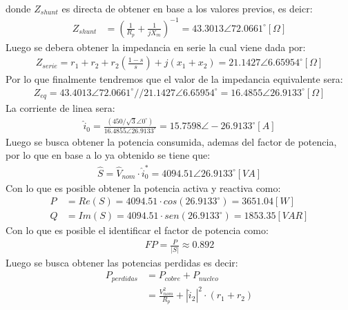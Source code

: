 \documentclass[
  11pt,
  letterpaper,
   addpoints,
   answers
  ]{exam}
\begin{document}
\begin{questions}
\begin{solution}
\begin{align}
        \end{align}
        donde $Z_{shunt}$ es directa de obtener en base a los valores previos, es deicr:
        \begin{align}
            Z_{shunt} &= \left( \frac{1}{R_{p}} + \frac{1}{jX_{m}}\right)^{-1} = 43.3013 \angle 72.0661^{\circ}[\Omega]
        \end{align}
        Luego se debera obtener la impedancia en serie la cual viene dada por:
        \begin{align}
            Z_{serie} = r_{1} + r_{2} + r_{2}\left(\frac{1-s}{s}\right) + j(x_{1} + x_{2}) = 21.1427 \angle 6.65954^{\circ}[\Omega]
        \end{align}
        Por lo que finalmente tendremos que el valor de la impedancia equivalente sera:
        \begin{align}
            Z_{eq} = 43.4013 \angle 72.0661^{\circ} // 21.1427 \angle 6.65954^{\circ} = 16.4855\angle 26.9133^{\circ}[\Omega]
        \end{align}
       La corriente de linea sera:
        \begin{align}
            \hat{i}_{0} = \frac{(450/\sqrt{3} \angle 0^{\circ})}{16.4855 \angle 26.9133^{\circ}} = 15.7598\angle -26.9133^{\circ}[A]
        \end{align}
        Luego se busca obtener la potencia consumida, ademas del factor de potencia, por lo que en base a lo ya obtenido se tiene que:
        \begin{align}
            \hat{S} = \hat{V}_{nom} \cdot \hat{i}_{0}^{*} = 4094.51 \angle 26.9133^{\circ}[VA]
        \end{align}
        Con lo que es posible obtener la potencia activa y reactiva como:
        \begin{align}
            P &= Re(S) = 4094.51\cdot cos(26.9133^{\circ}) = 3651.04[W]\\
            Q &= Im(S) = 4094.51 \cdot sen(26.9133^{\circ}) = 1853.35[VAR]
        \end{align}
        Con lo que es posible el identificar el factor de potencia como:
        \begin{align}
            FP = \frac{P}{|S|} \approx 0.892
        \end{align}
        Luego se busca obtener las potencias perdidas es decir:
        \begin{align}
            P_{perdidas} &= P_{cobre} + P_{nucleo}\\
            &= \frac{V_{nom}^{2}}{R_{p}} + |\hat{i}_{2}|^{2} \cdot(r_{1} + r_{2}) 

\end{align}
\end{solution}
\end{questions}
\end{document}

